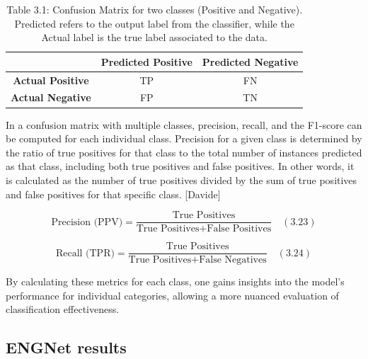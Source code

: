 \documentclass{Configuration_Files/PoliMi3i_thesis}
\begin{document}
\begin{table}[H]
\centering
\caption*{Table 3.1: Confusion Matrix for two classes (Positive and Negative). Predicted refers to the output label from the classifier, while the Actual label is the true label associated to the data.}
\begin{tabular}{|c|c|c|}
\hline
 & \textbf{Predicted Positive} & \textbf{Predicted Negative} \\
\hline
\textbf{Actual Positive} & TP & FN \\
\hline
\textbf{Actual Negative} & FP & TN \\
\hline
\end{tabular}
\end{table}

In a confusion matrix with multiple classes, precision, recall, and the F1-score can be computed for each individual class. Precision for a given class is determined by the ratio of true positives for that class to the total number of instances predicted as that class, including both true positives and false positives. In other words, it is calculated as the number of true positives divided by the sum of true positives and false positives for that specific class. [Davide]

\begin{equation}
	\text{Precision (PPV)} = \frac{\text{True Positives}}{\text{True Positives} + \text{False Positives}} \quad (3.23)
	\end{equation}
	
	\begin{equation}
	\text{Recall (TPR)} = \frac{\text{True Positives}}{\text{True Positives} + \text{False Negatives}} \quad (3.24)
	\end{equation}

By calculating these metrics for each class, one gains insights into the model’s performance for individual categories, allowing a more nuanced evaluation of classification effectiveness.

\subsection{ENGNet results}
\end{document}

